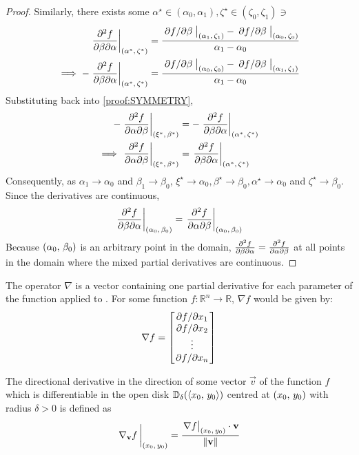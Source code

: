 \begin{lemma}
\begin{proof}
		Similarly, there exists some $\alpha^\star\in(\alpha_0,\alpha_1),\zeta^\star\in(\zeta_0,\zeta_1)\ni$
		\begin{align*}
			\eval{\pdv{f}{\beta}{\alpha}}_{\point{\alpha^\star}{\zeta^\star}}&=\frac{\eval{\pdv*{f}{\beta}}_{\point{\alpha_1}{\zeta_1}}-\eval{\pdv*{f}{\beta}}_{\point{\alpha_0}{\zeta_0}}}{\alpha_1-\alpha_0}\\
			\implies-\eval{\pdv{f}{\beta}{\alpha}}_{\point{\alpha^\star}{\zeta^\star}}&=\frac{\eval{\pdv*{f}{\beta}}_{\point{\alpha_0}{\zeta_0}}-\eval{\pdv*{f}{\beta}}_{\point{\alpha_1}{\zeta_1}}}{\alpha_1-\alpha_0}
		\end{align*}
		Substituting back into \eqref{proof:SYMMETRY},
		\begin{align*}
			-\eval{\pdv{f}{\alpha}{\beta}}_{\point{\xi^\star}{\beta^\star}}&=-\eval{\pdv{f}{\beta}{\alpha}}_{\point{\alpha^\star}{\zeta^\star}}\\
			\implies\eval{\pdv{f}{\alpha}{\beta}}_{\point{\xi^\star}{\beta^\star}}&=\eval{\pdv{f}{\beta}{\alpha}}_{\point{\alpha^\star}{\zeta^\star}}
		\end{align*}
		Consequently, as $\alpha_1\rightarrow\alpha_0$ and $\beta_1\rightarrow\beta_0$, $\xi^\star\rightarrow\alpha_0,\beta^\star\rightarrow\beta_0,\alpha^\star\rightarrow\alpha_0$ 
		and $\zeta^\star\rightarrow\beta_0$. Since the derivatives are continuous,
		$$
			\eval{\pdv{f}{\beta}{\alpha}}_{\point{\alpha_0}{\beta_0}}=\eval{\pdv{f}{\alpha}{\beta}}_{\point{\alpha_0}{\beta_0}}
		$$
		Because $(\alpha_0,\,\beta_0)$ is an arbitrary point in the domain, $\pdv{f}{\beta}{\alpha}=\pdv{f}{\alpha}{\beta}$ at 
		all points in the domain where the mixed partial derivatives are continuous.
	\end{proof}
\end{lemma}
\begin{defn}
	The  operator $\nabla$ is a vector containing one partial derivative for each parameter of
	the function applied to \cite{RAPP2017137}. For some function $f:\mathbb{R}^n\rightarrow\mathbb{R}$, $\nabla f$ would be given by:
	$$
	\nabla f=\begin{bmatrix}
		\pdv*{f}{x_1}\\
		\pdv*{f}{x_2}\\
		\vdots\\
		\pdv*{f}{x_n}
	\end{bmatrix}
	$$
\end{defn}
\begin{defn}
	The directional derivative in the direction of some vector $\vec{v}$ of the function $f$ which is differentiable in
	the open disk $\mathbb{D}_\delta(\langle x_0,\,y_0\rangle)$ centred at $(x_0,\,y_0)$ with radius $\delta>0$ is defined as
	$$
		\eval{\nabla_{\vec{v}}f\,}_{\point{x_0}{y_0}}=\frac{\eval{\nabla f}_{\point{x_0}{y_0}}\cdot\vec{v}}{\lVert\vec{v}\rVert}
	$$
	\cite{GIANNAKIDIS2010129}
\end{defn}